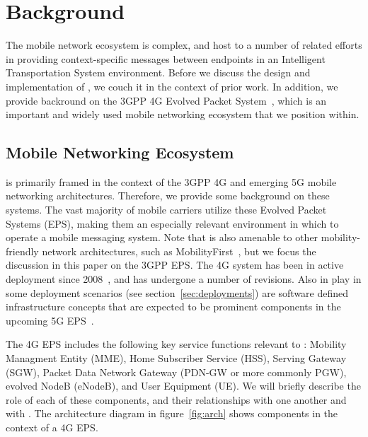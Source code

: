 \section{Background}

The mobile network ecosystem is complex, and host to a number of
related efforts in providing context-specific messages between
endpoints in an Intelligent Transportation System environment. Before
we discuss the design and implementation of \name, we couch it in
the context of prior work. In addition, we provide backround on the
3GPP 4G Evolved Packet System~\cite{4G}, which is an important and
widely used mobile networking ecosystem that we position \name{} 
within.

%
%


\subsection{Mobile Networking Ecosystem}

\name{} is primarily framed in the context of the 3GPP 4G and emerging
5G mobile networking architectures. Therefore, we provide some
background on these systems.  The vast majority of mobile carriers
utilize these Evolved Packet Systems (EPS), making them an especially
relevant environment in which to operate a mobile messaging system.
Note that \name{} is also amenable to other mobility-friendly network
architectures, such as MobilityFirst~\cite{raychaudhuri2012mobilityfirst}, 
but we
focus the discussion in this paper on the 3GPP EPS.  The 4G system has
been in active deployment since 2008~\cite{chen2015financial}, and has
undergone a number of revisions. Also in play in some deployment
scenarios (see section~\ref{sec:deployments}) are software defined
infrastructure concepts that are expected to be prominent components
in the upcoming 5G EPS~\cite{5gvision}.

The 4G EPS includes the following key service functions relevant to
\name: Mobility Managment Entity (MME), Home Subscriber Service
(HSS), Serving Gateway (SGW), Packet Data Network Gateway (PDN-GW or
more commonly PGW), evolved NodeB (eNodeB), and User Equipment (UE).
We will briefly describe the role of each of these components, and
their relationships with one another and with \name. The \name{} 
architecture diagram in figure~\ref{fig:arch} shows \name{} 
components in the context of a 4G EPS.

